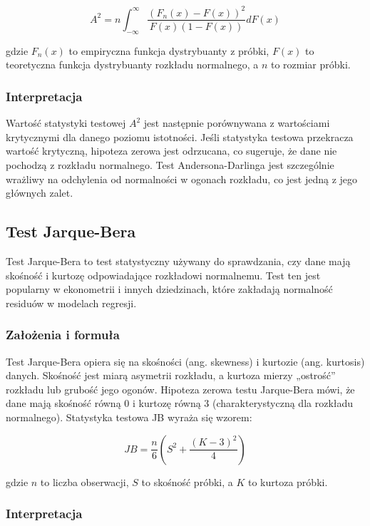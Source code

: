 \documentclass{article}
\begin{document}
\[ A^2 = n\int_{-\infty}^{\infty} \frac{(F_n(x) - F(x))^2}{F(x)(1-F(x))}dF(x) \]

gdzie \(F_n(x)\) to empiryczna funkcja dystrybuanty z próbki, \(F(x)\) to teoretyczna funkcja dystrybuanty rozkładu normalnego, a \(n\) to rozmiar próbki.

\subsubsection{Interpretacja}

Wartość statystyki testowej \(A^2\) jest następnie porównywana z wartościami krytycznymi dla danego poziomu istotności. Jeśli statystyka testowa przekracza wartość krytyczną, hipoteza zerowa jest odrzucana, co sugeruje, że dane nie pochodzą z rozkładu normalnego. Test Andersona-Darlinga jest szczególnie wrażliwy na odchylenia od normalności w ogonach rozkładu, co jest jedną z jego głównych zalet.

\subsection{Test Jarque-Bera}

Test Jarque-Bera to test statystyczny używany do sprawdzania, czy dane mają skośność i kurtozę odpowiadające rozkładowi normalnemu. Test ten jest popularny w ekonometrii i innych dziedzinach, które zakładają normalność residuów w modelach regresji.

\subsubsection{Założenia i formuła}

Test Jarque-Bera opiera się na skośności (ang. skewness) i kurtozie (ang. kurtosis) danych. Skośność jest miarą asymetrii rozkładu, a kurtoza mierzy „ostrość” rozkładu lub grubość jego ogonów. Hipoteza zerowa testu Jarque-Bera mówi, że dane mają skośność równą 0 i kurtozę równą 3 (charakterystyczną dla rozkładu normalnego). Statystyka testowa JB wyraża się wzorem:

\[ JB = \frac{n}{6}(S^2 + \frac{(K-3)^2}{4}) \]

gdzie \(n\) to liczba obserwacji, \(S\) to skośność próbki, a \(K\) to kurtoza próbki.

\subsubsection{Interpretacja}
\end{document}
